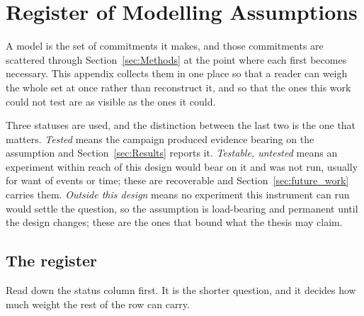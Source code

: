 \section{Register of Modelling Assumptions}
\label{app:assumptions}

A model is the set of commitments it makes, and those commitments are scattered through
Section~\ref{sec:Methods} at the point where each first becomes necessary. This appendix
collects them in one place so that a reader can weigh the whole set at once rather than
reconstruct it, and so that the ones this work could not test are as visible as the ones it
could.

Three statuses are used, and the distinction between the last two is the one that matters.
\emph{Tested} means the campaign produced evidence bearing on the assumption and
Section~\ref{sec:Results} reports it. \emph{Testable, untested} means an experiment within
reach of this design would bear on it and was not run, usually for want of events or time;
these are recoverable and Section~\ref{sec:future_work} carries them. \emph{Outside this
design} means no experiment this instrument can run would settle the question, so the
assumption is load-bearing and permanent until the design changes; these are the ones that
bound what the thesis may claim.

\subsection{The register}

Read down the status column first. It is the shorter question, and it decides how much
weight the rest of the row can carry.

